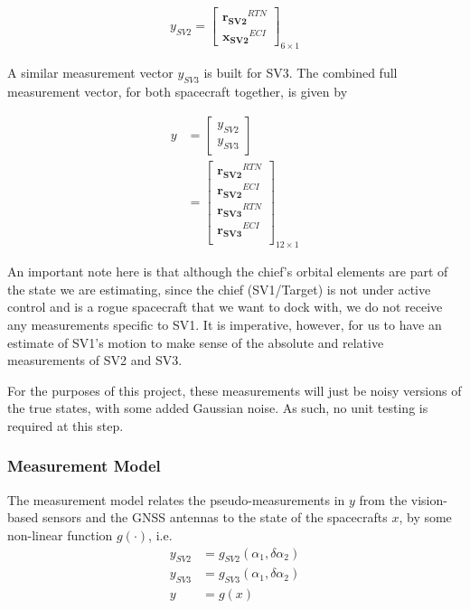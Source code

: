 \begin{align}
    y_{SV2} = \begin{bmatrix}
        \boldsymbol{r_{SV2}}^{RTN}\\
        \boldsymbol{x_{SV2}}^{ECI}
    \end{bmatrix}_{6\times 1}
\end{align}

A similar measurement vector $y_{SV3}$ is built for SV3. The combined full measurement vector, for both spacecraft together, is given by

\begin{align}
    y &= \begin{bmatrix}
        y_{SV2} \\
        y_{SV3}
    \end{bmatrix} \\
    &= \begin{bmatrix}
        \boldsymbol{r_{SV2}}^{RTN}\\
        \boldsymbol{r_{SV2}}^{ECI} \\
        \boldsymbol{r_{SV3}}^{RTN} \\
        \boldsymbol{r_{SV3}}^{ECI} \\
    \end{bmatrix}_{12\times 1}
\end{align}

An important note here is that although the chief's orbital elements are part of the state we are estimating, since the chief (SV1/Target) is not under active control and is a rogue spacecraft that we want to dock with, we do not receive any measurements specific to SV1. It is imperative, however, for us to have an estimate of SV1's motion to make sense of the absolute and relative measurements of SV2 and SV3.

For the purposes of this project, these measurements will just be noisy versions of the true states, with some added Gaussian noise. As such, no unit testing is required at this step.

\subsubsection{Measurement Model}
The measurement model relates the pseudo-measurements in $y$ from the vision-based sensors and the GNSS antennas to the state of the spacecrafts $x$, by some non-linear function $g(\cdot)$, i.e.
\begin{align}
    y_{SV2} &= g_{SV2}(\alpha_{1}, \delta \alpha _{2}) \\
    y_{SV3} &= g_{SV3}(\alpha_{1}, \delta \alpha _{2}) \\
    y &= g(x)
\end{align}


